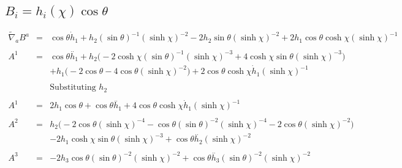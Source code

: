 \documentclass[10pt,letterpaper]{article}
\numberwithin{equation}{section}
\begin{document}
\subsection{$B_i = h_i(\chi)\cos\theta$}
\begin{eqnarray}
\tilde\nabla_a B^a &=& \cos\theta \dot{h}_{1} + h_{2} (\sin\theta)^{-1} (\sinh\chi)^{-2} - 2 h_{2} \sin\theta (\sinh\chi)^{-2} + 2 h_{1} \cos\theta \cosh\chi (\sinh\chi)^{-1}
\\ \nonumber\\
A^{1}&=& \cos\theta \overset{..}{h}_{1} + h_{2} \bigl(-2 \cosh\chi (\sin\theta)^{-1} (\sinh\chi)^{-3} + 4 \cosh\chi \sin\theta (\sinh\chi)^{-3}\bigr) \nonumber \\ 
&& + h_{1} \bigl(-2 \cos\theta - 4 \cos\theta (\sinh\chi)^{-2}\bigr) + 2 \cos\theta \cosh\chi \dot{h}_{1} (\sinh\chi)^{-1}
\\ \nonumber\\
&&\text{Substituting $h_2$}
\\ \nonumber\\
A^{1}&=& 2 h_{1} \cos\theta + \cos\theta \overset{..}{h}_{1} + 4 \cos\theta \cosh\chi \dot{h}_{1} (\sinh\chi)^{-1}
\\ \nonumber\\
A^{2}&=& h_{2} \bigl(-2 \cos\theta (\sinh\chi)^{-4} -  \cos\theta (\sin\theta)^{-2} (\sinh\chi)^{-4} - 2 \cos\theta (\sinh\chi)^{-2}\bigr) \nonumber \\ 
&& - 2 h_{1} \cosh\chi \sin\theta (\sinh\chi)^{-3} + \cos\theta \overset{..}{h}_{2} (\sinh\chi)^{-2}
\\ \nonumber\\
A^{3}&=& -2 h_{3} \cos\theta (\sin\theta)^{-2} (\sinh\chi)^{-2} + \cos\theta \overset{..}{h}_{3} (\sin\theta)^{-2} (\sinh\chi)^{-2}
\end{eqnarray}
\end{document}
